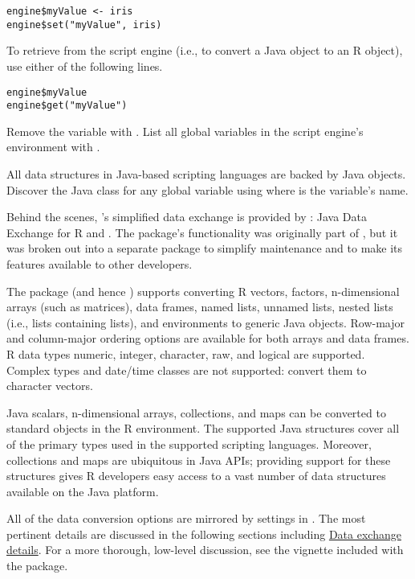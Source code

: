 \begin{verbatim}
engine$myValue <- iris
engine$set("myValue", iris)
\end{verbatim}

To retrieve  from the script engine (i.e., to convert a Java object to an R object), use either of the following lines.

\begin{verbatim}
engine$myValue
engine$get("myValue")
\end{verbatim}

Remove the  variable with . List all global variables in the script engine's environment with .

All data structures in Java-based scripting languages are backed by Java objects. Discover the Java class for any global variable using   where  is the variable's name.

Behind the scenes, 's simplified data exchange is provided by : Java Data Exchange for R and . The  package's functionality was originally part of , but it was broken out into a separate package to simplify maintenance and to make its features available to other developers.

The  package (and hence ) supports converting R vectors, factors, n-dimensional arrays (such as matrices), data frames, named lists, unnamed lists, nested lists (i.e., lists containing lists), and environments to generic Java objects. Row-major and column-major ordering options are available for both arrays and data frames. R data types numeric, integer, character, raw, and logical are supported. Complex types and date/time classes are not supported: convert them to character vectors.

Java scalars, n-dimensional arrays, collections, and maps can be converted to standard objects in the R environment. The supported Java structures cover all of the primary types used in the supported scripting languages. Moreover, collections and maps are ubiquitous in Java APIs; providing support for these structures gives R developers easy access to a vast number of data structures available on the Java platform.

All of the  data conversion options are mirrored by settings in . The most pertinent details are discussed in the following sections including \hyperlink{dataexchangedetails}{Data exchange details}. For a more thorough, low-level discussion, see the vignette included with the  package. 

